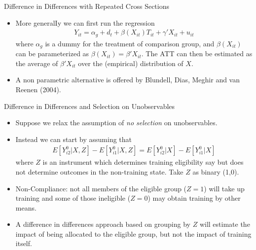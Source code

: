 \documentclass[xcolor=pdftex,dvipsnames,table,mathserif]{beamer}
\begin{document}
\begin{frame}{Difference in Differences with Repeated Cross Sections}
\begin{itemize}
\item More generalIy we can first run the regression 
\begin{align*}
Y_{it} = \alpha_g + d_t + \beta (X_{it}) T_{it} + \gamma' X_{it} + u_{it}
\end{align*} 
where $\alpha_g$ is a dummy for the treatment of comparison group, and $\beta (X_{it})$ can be parameterized as $\beta(X_{it}) = \beta' X_{it}$. The ATT can then be estimated as the average of $\beta' X_{it}$ over the (empirical) distribution of $X$.
\item A non parametric alternative is offered by Blundell, Dias, Meghir and van Reenen (2004).
\end{itemize}
\end{frame}

\begin{frame}{Difference in Differences and Selection on Unobservables}
\begin{itemize}
\item Suppose we relax the assumption of \emph{no selection} on unobservables. 
\item Instead we can start by assuming that
\begin{align*}
E[Y_{i2}^0 | X,Z] - E[Y_{i1}^0 | X,Z] = E[Y_{i2}^0 | X] - E[Y_{i1}^0 | X]
\end{align*} 
where $Z$ is an instrument which determines training eligibility say but does not determine outcomes in the non-training state. Take $Z$ as binary (1,0).
\item Non-Compliance: not all members of the eligible group ($Z = 1$) will take up training and some of those ineligible ($Z = 0$) may obtain training by other means.
\item A difference in differences approach based on grouping by $Z$ will estimate the impact of being allocated to the eligible group, but not the impact of training itself.
\end{itemize}
\end{frame}
\end{document}
